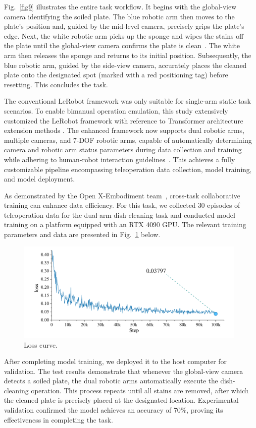 \documentclass[runningheads]{llncs}
\begin{document}
Fig.~\ref{fig9} illustrates the entire task workflow. It begins with the global-view camera identifying the soiled plate. The blue robotic arm then moves to the plate's position and, guided by the mid-level camera, precisely grips the plate's edge. Next, the white robotic arm picks up the sponge and wipes the stains off the plate until the global-view camera confirms the plate is clean~\cite{fu_deep_2022}. The white arm then releases the sponge and returns to its initial position. Subsequently, the blue robotic arm, guided by the side-view camera, accurately places the cleaned plate onto the designated spot (marked with a red positioning tag) before resetting. This concludes the task.


The conventional LeRobot framework was only suitable for single-arm static task scenarios. To enable bimanual operation emulation, this study extensively customized the LeRobot framework with reference to Transformer architecture extension methods . The enhanced framework now supports dual robotic arms, multiple cameras, and 7-DOF robotic arms, capable of automatically determining camera and robotic arm status parameters during data collection and training while adhering to human-robot interaction guidelines~\cite{ref15}. This achieves a fully customizable pipeline encompassing teleoperation data collection, model training, and model deployment.


As demonstrated by the Open X-Embodiment team~\cite{ref16}, cross-task collaborative training can enhance data efficiency. For this task, we collected 30 episodes of teleoperation data for the dual-arm dish-cleaning task and conducted model training on a platform equipped with an RTX 4090 GPU. The relevant training parameters and data are presented in Fig.~\ref{fig19} below.


\begin{figure}
\centering
\includegraphics[width=323pt]{fig8.pdf}
\caption{Loss curve.} \label{fig19}
\end{figure}


\noindent After completing model training, we deployed it to the host computer for validation. The test results demonstrate that whenever the global-view camera detects a soiled plate, the dual robotic arms automatically execute the dish-cleaning operation. This process repeats until all stains are removed, after which the cleaned plate is precisely placed at the designated location. Experimental validation confirmed the model achieves an accuracy of 70\%, proving its effectiveness in completing the task.
\end{document}
